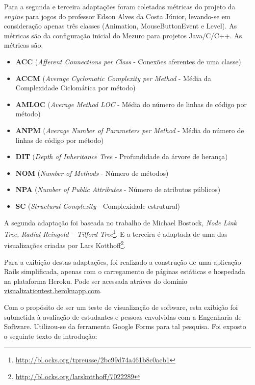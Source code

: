 Para a segunda e terceira adaptações foram coletadas métricas do projeto da \textit{engine} para jogos do professor Edson Alves da Costa Júnior, levando-se em consideração apenas três classes (Animation, MouseButtonEvent e Level). As métricas são da configuração inicial do Mezuro para projetos Java/C/C++. As métricas são:


\begin{itemize}
  \item \textbf{ACC} (\textit{Afferent Connections per Class} - Conexões aferentes de uma classe)
  \item \textbf{ACCM} (\textit{Average Cyclomatic Complexity per Method} - Média da Complexidade Ciclomática por método)
  \item \textbf{AMLOC} (\textit{Average Method LOC} - Média do número de linhas de código por método)
  \item \textbf{ANPM} (\textit{Average Number of Parameters per Method} - Média do número de linhas de código por método)
  \item \textbf{DIT} (\textit{Depth of Inheritance Tree} - Profundidade da árvore de herança)
  \item \textbf{NOM} (\textit{Number of Methods} - Número de métodos)
  \item \textbf{NPA} (\textit{Number of Public Attributes} - Número de atributos públicos)
  \item \textbf{SC} (\textit{Structural Complexity} - Complexidade estrutural)
\end{itemize}

A segunda adaptação foi baseada no trabalho de Michael Bostock, \textit{Node Link Tree, Radial Reingold – Tilford Tree}\footnote{\url{http://bl.ocks.org/tpreusse/2bc99d74a461b8c0acb1}}. E a terceira é adaptada de uma das visualizações criadas por Lars Kotthoff\footnote{\url{http://bl.ocks.org/larskotthoff/7022289}}.

Para a exibição destas adaptações, foi realizado a construção de uma aplicação Rails simplificada, apenas com o carregamento de páginas estáticas e hospedada na plataforma Heroku. Pode ser acessada atráves do domínio \href{https://visualizationtest.herokuapp.com/}{visualizationtest.herokuapp.com}.

Com o propósito de ser um teste de visualização de software, esta exibição foi submetida à avaliação de estudantes e pessoas envolvidas com a Engenharia de Software. Utilizou-se da ferramenta Google Forms para tal pesquisa. Foi exposto o seguinte texto de introdução:


